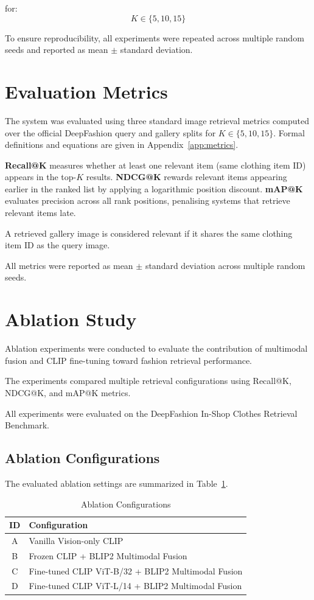 \documentclass[11pt,a4paper]{article}
\begin{document}
for:
\[
K \in \{5, 10, 15\}
\]

To ensure reproducibility, all experiments were repeated across multiple random seeds and reported as mean $\pm$ standard deviation.

\section{Evaluation Metrics}

The system was evaluated using three standard image retrieval metrics computed over the official DeepFashion query and gallery splits for $K \in \{5, 10, 15\}$. Formal definitions and equations are given in Appendix~\ref{app:metrics}.

\textbf{Recall@K} measures whether at least one relevant item (same clothing item ID) appears in the top-$K$ results. \textbf{NDCG@K} rewards relevant items appearing earlier in the ranked list by applying a logarithmic position discount. \textbf{mAP@K} evaluates precision across all rank positions, penalising systems that retrieve relevant items late.

A retrieved gallery image is considered relevant if it shares the same clothing item ID as the query image.

All metrics were reported as mean $\pm$ standard deviation across multiple random seeds.

\section{Ablation Study}

Ablation experiments were conducted to evaluate the contribution of multimodal fusion and CLIP fine-tuning toward fashion retrieval performance.

The experiments compared multiple retrieval configurations using Recall@K, NDCG@K, and mAP@K metrics.

All experiments were evaluated on the DeepFashion In-Shop Clothes Retrieval Benchmark.

\subsection{Ablation Configurations}

The evaluated ablation settings are summarized in Table~\ref{tab:ablation_configs}.

\begin{table}[H]
\centering
\caption{Ablation Configurations}
\label{tab:ablation_configs}
\begin{tabular}{cl}
\toprule
ID & Configuration \\
\midrule
A & Vanilla Vision-only CLIP \\
B & Frozen CLIP + BLIP2 Multimodal Fusion \\
C & Fine-tuned CLIP ViT-B/32 + BLIP2 Multimodal Fusion \\
D & Fine-tuned CLIP ViT-L/14 + BLIP2 Multimodal Fusion \\
\bottomrule
\end{tabular}
\end{table}
\end{document}
